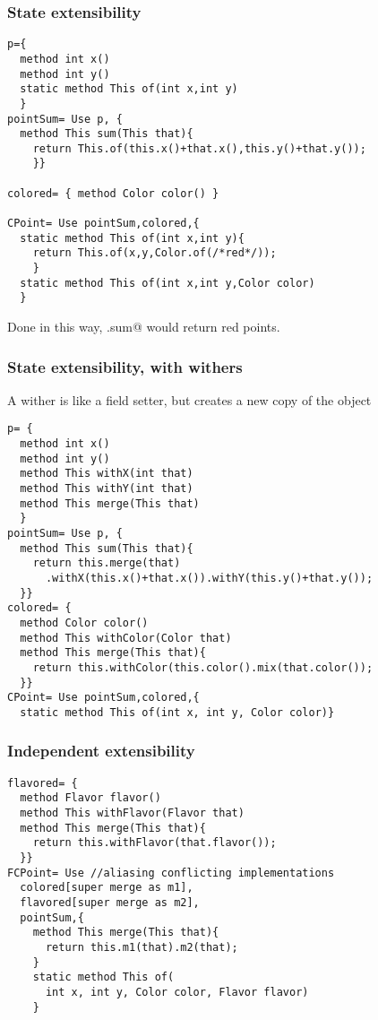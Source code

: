 \begin{frame}[fragile]
\frametitle{State extensibility}
\vspace{-2ex}
\begin{lstlisting}
p={
  method int x()
  method int y()
  static method This of(int x,int y)
  }
pointSum= Use p, {
  method This sum(This that){
    return This.of(this.x()+that.x(),this.y()+that.y());
    }}

colored= { method Color color() }

CPoint= Use pointSum,colored,{
  static method This of(int x,int y){
    return This.of(x,y,Color.of(/*red*/));
    }
  static method This of(int x,int y,Color color) 
  }
\end{lstlisting}

Done in this way, \Q@CPoint.sum@ would return red points.
\end{frame}

\begin{frame}[fragile]
\frametitle{State extensibility, with withers}
\vspace{-1ex}
A wither is like a field setter, but creates a new copy of the object
\vspace{-1ex}
 \begin{lstlisting}
p= { 
  method int x()
  method int y()
  method This withX(int that)
  method This withY(int that)
  method This merge(This that)
  }
pointSum= Use p, { 
  method This sum(This that){
    return this.merge(that)
      .withX(this.x()+that.x()).withY(this.y()+that.y());
  }}
colored= {
  method Color color()
  method This withColor(Color that)
  method This merge(This that){
    return this.withColor(this.color().mix(that.color());
  }}
CPoint= Use pointSum,colored,{
  static method This of(int x, int y, Color color)}
\end{lstlisting}  
\end{frame}





\begin{frame}[fragile]
\frametitle{Independent extensibility}

 \begin{lstlisting}
flavored= {
  method Flavor flavor()
  method This withFlavor(Flavor that)
  method This merge(This that){
    return this.withFlavor(that.flavor());
  }}
FCPoint= Use //aliasing conflicting implementations
  colored[super merge as m1],
  flavored[super merge as m2],
  pointSum,{
    method This merge(This that){
      return this.m1(that).m2(that);
    }
    static method This of(
      int x, int y, Color color, Flavor flavor)
    }
\end{lstlisting} 
\end{frame}


